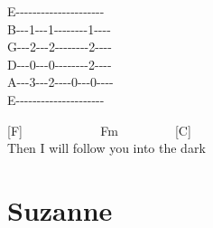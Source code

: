 \documentclass[
  letterpaper,
  twoside=false]{scrbook}
\begin{document}
E-\/-\/-\/-\/-\/-\/-\/-\/-\/-\/-\/-\/-\/-\/-\/-\/-\/-\/-\/-\/-\textbar{}\\
B-\/-\/-1-\/-\/-1-\/-\/-\/-\/-\/-\/-\/-1-\/-\/-\/-\textbar{}\\
G-\/-\/-2-\/-\/-2-\/-\/-\/-\/-\/-\/-\/-2-\/-\/-\/-\textbar{}\\
D-\/-\/-0-\/-\/-0-\/-\/-\/-\/-\/-\/-\/-2-\/-\/-\/-\textbar{}\\
A-\/-\/-3-\/-\/-2-\/-\/-\/-0-\/-\/-0-\/-\/-\/-\textbar{}\\
E-\/-\/-\/-\/-\/-\/-\/-\/-\/-\/-\/-\/-\/-\/-\/-\/-\/-\/-\/-\/-\textbar{}

{[}F{]} ~ ~ ~ ~ ~ ~ ~ Fm ~ ~ ~ ~ ~ {[}C{]} ~\\
Then I will follow you into the dark

\hypertarget{suzanne}{%
\chapter{Suzanne}\label{suzanne}}
\end{document}
